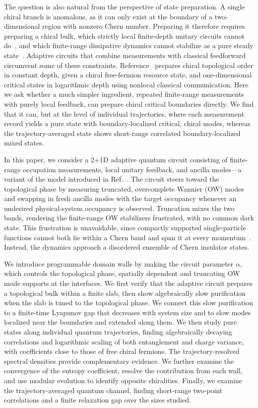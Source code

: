 The question is also natural from the perspective of state preparation. A single chiral branch is anomalous, as it can only exist at the boundary of a two-dimensional region with nonzero Chern number. Preparing it therefore requires preparing a chiral bulk, which strictly local finite-depth unitary circuits cannot do~\cite{LuLessaKimHsieh2022}, and which finite-range dissipative dynamics cannot stabilize as a pure steady state~\cite{BardynEtAl2013,BudichZollerDiehl2015,Goldstein2019}. Adaptive circuits that combine measurements with classical feedforward circumvent some of these constraints. Reference~\cite{LuLessaKimHsieh2022} prepares chiral topological order in constant depth, given a chiral free-fermion resource state, and one-dimensional critical states in logarithmic depth using nonlocal classical communication. Here we ask whether a much simpler ingredient, repeated finite-range measurements with purely local feedback, can prepare chiral critical boundaries directly. We find that it can, but at the level of individual trajectories, where each measurement record yields a pure state with boundary-localized critical, chiral modes, whereas the trajectory-averaged state shows short-range correlated boundary-localized mixed states.

In this paper, we consider a 2+1D adaptive quantum circuit consisting of finite-range occupation measurements, local unitary feedback, and ancilla modes---a variant of the model introduced in Ref.~\cite{BhuiyanPanJian2026}. The circuit steers toward the topological phase by measuring truncated, overcomplete Wannier (OW) modes and swapping in fresh ancilla modes with the target occupancy whenever an undesired physical-system occupancy is observed. Truncation mixes the two bands, rendering the finite-range OW stabilizers frustrated, with no common dark state. This frustration is unavoidable, since compactly supported single-particle functions cannot both lie within a Chern band and span it at every momentum~\cite{DubailRead2015}. Instead, the dynamics approach a disordered ensemble of Chern insulator states.

We introduce programmable domain walls by making the circuit parameter $\alpha$, which controls the topological phase, spatially dependent and truncating OW mode supports at the interfaces. We first verify that the adaptive circuit prepares a topological bulk within a finite slab, then show algebraically slow purification when the slab is tuned to the topological phase. We connect this slow purification to a finite-time Lyapunov gap that decreases with system size and to slow modes localized near the boundaries and extended along them. We then study pure states along individual quantum trajectories, finding algebraically decaying correlations and logarithmic scaling of both entanglement and charge variance, with coefficients close to those of free chiral fermions. The trajectory-resolved spectral densities provide complementary evidence. We further examine the convergence of the entropy coefficient, resolve the contribution from each wall, and use modular evolution to identify opposite chiralities. Finally, we examine the trajectory-averaged quantum channel, finding short-range two-point correlations and a finite relaxation gap over the sizes studied.

